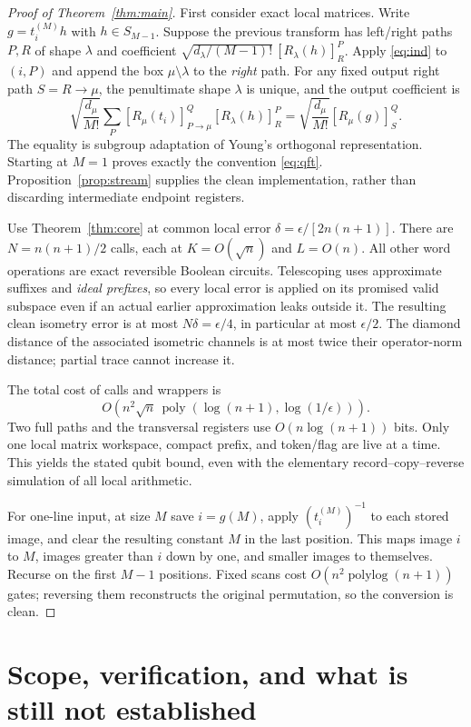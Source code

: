 \documentclass[11pt]{article}
\theoremstyle{definition}
\newcommand{\poly}{\operatorname{poly}}
\newcommand{\polylog}{\operatorname{polylog}}
\begin{document}
\begin{proof}[Proof of Theorem~\ref{thm:main}]
First consider exact local matrices. Write $g=t_i^{(M)}h$ with
$h\in S_{M-1}$. Suppose the previous transform has left/right paths
$P,R$ of shape $\lambda$ and coefficient
$\sqrt{d_\lambda/(M-1)!}\,[R_\lambda(h)]^P_R$.
Apply \eqref{eq:ind} to $(i,P)$ and append the box $\mu\setminus\lambda$
to the \emph{right} path. For any fixed output right path
$S=R\to\mu$, the penultimate shape $\lambda$ is unique, and the output
coefficient is
\[
 \sqrt{\frac{d_\mu}{M!}}
 \sum_P [R_\mu(t_i)]^Q_{P\to\mu}[R_\lambda(h)]^P_R
 =\sqrt{\frac{d_\mu}{M!}}[R_\mu(g)]^Q_S.
\]
The equality is subgroup adaptation of Young's orthogonal representation.
Starting at $M=1$ proves exactly the convention \eqref{eq:qft}.
Proposition~\ref{prop:stream} supplies the clean implementation, rather
than discarding intermediate endpoint registers.

Use Theorem~\ref{thm:core} at common local error
$\delta=\epsilon/[2n(n+1)]$. There are
$N=n(n+1)/2$ calls, each at $K=O(\sqrt n)$ and $L=O(n)$.
All other word operations are exact reversible Boolean circuits.
Telescoping uses approximate suffixes and \emph{ideal prefixes}, so every
local error is applied on its promised valid subspace even if an actual
earlier approximation leaks outside it. The resulting clean isometry
error is at most $N\delta=\epsilon/4$, in particular at most $\epsilon/2$.
The diamond distance of the associated isometric channels is at most twice
their operator-norm distance; partial trace cannot increase it.

The total cost of calls and wrappers is
\[
 O\!\left(n^2\sqrt n\,
   \poly(\log(n+1),\log(1/\epsilon))\right).
\]
Two full paths and the transversal registers use $O(n\log(n+1))$ bits.
Only one local matrix workspace, compact prefix, and token/flag are live
at a time. This yields the stated qubit bound, even with the elementary
record--copy--reverse simulation of all local arithmetic.

For one-line input, at size $M$ save $i=g(M)$, apply $(t_i^{(M)})^{-1}$
to each stored image, and clear the resulting constant $M$ in the last
position. This maps image $i$ to $M$, images greater than $i$ down by one,
and smaller images to themselves. Recurse on the first $M-1$ positions.
Fixed scans cost $O(n^2\polylog(n+1))$ gates; reversing them reconstructs
the original permutation, so the conversion is clean.
\end{proof}

\section{Scope, verification, and what is still not established}
\end{document}
